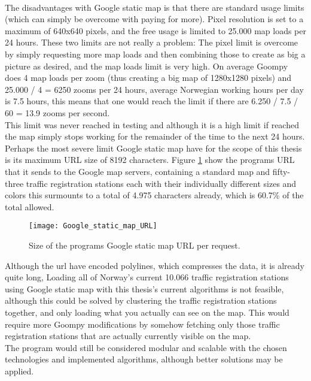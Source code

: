 \\
The disadvantages with Google static map is that there are standard usage limits (which can simply be overcome with paying for more). Pixel resolution is set to a maximum of 640x640 pixels, and the free usage is limited to 25.000 map loads per 24 hours. These two limits are not really a problem: The pixel limit is overcome by simply requesting more map loads and then combining those to create as big a picture as desired, and the map loads limit is very high. On average Goompy does 4 map loads per zoom (thus creating a big map of 1280x1280 pixels) and 25.000 / 4 = 6250 zooms per 24 hours, average Norwegian working hours per day is 7.5 hours, this means that one would reach the limit if there are 6.250 / 7.5 / 60 = 13.9 zooms per second. 
\\
This limit was never reached in testing and although it is a high limit if reached the map simply stops working for the remainder of the time to the next 24 hours. Perhaps the most severe limit Google static map have for the scope of this thesis is its maximum URL size of 8192 characters. Figure \ref{fig:google_url} show the programs URL that it sends to the Google map servers, containing a standard map and fifty-three traffic registration stations each with their individually different sizes and colors this surmounts to a total of 4.975 characters already, which is 60.7\% of the total allowed. 

\begin{figure}[!htb]
\texttt{[image: Google\_static\_map\_URL]}
\centering
\caption{Size of the programs Google static map URL per request.}
\label{fig:google_url}
\end{figure}

Although the url have encoded polylines, which compresses the data, it is already quite long, Loading all of Norway's current 10.066 traffic registration stations using Google static map with this thesis's current algorithms is not feasible, although this could be solved by clustering the traffic registration stations together, and only loading what you actually can see on the map. This would require more Goompy modifications by somehow fetching only those traffic registration stations that are actually currently visible on the map.
\\
The program would still be considered modular and scalable with the chosen technologies and implemented algorithms, although better solutions may be applied.






